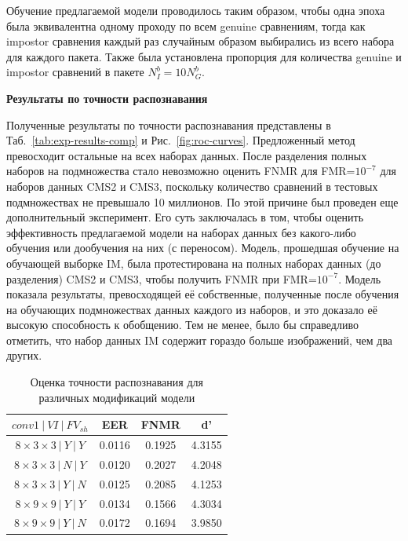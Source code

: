 Обучение предлагаемой модели проводилось таким образом, чтобы одна эпоха была эквивалентна одному проходу по всем genuine сравнениям, тогда как impostor сравнения каждый раз случайным образом выбирались из всего набора для каждого пакета. Также была установлена пропорция для количества genuine и impostor сравнений в пакете $N^b_I=10N^b_G$.

{\bf Результаты по точности распознавания}
\label{sec:fem-nn-exp-results-acc}

Полученные результаты по точности распознавания представлены в Таб.~\ref{tab:exp-results-comp} и Рис.~\ref{fig:roc-curves}. Предложенный метод превосходит остальные на всех наборах данных. После разделения полных наборов на подмножества стало невозможно оценить FNMR для FMR=$10^{-7}$ для наборов данных CMS2 и CMS3, поскольку количество сравнений в тестовых подмножествах не превышало 10 миллионов. По этой причине был проведен еще дополнительный эксперимент. Его суть заключалась в том, чтобы оценить эффективность предлагаемой модели на наборах данных без какого-либо обучения или дообучения на них (с переносом). Модель, прошедшая обучение на обучающей выборке IM, была протестирована на полных наборах данных (до разделения) CMS2 и CMS3, чтобы получить FNMR при FMR=$10^{-7}$. Модель показала результаты, превосходящей её собственные, полученные после обучения на обучающих подмножествах данных каждого из наборов, и это доказало её высокую способность к обобщению. Тем не менее, было бы справедливо отметить, что набор данных IM содержит гораздо больше изображений, чем два других.

\begin{table}
	\begin{center}
		\begin{tabular}{|c|c|c|c|}
			\hline
			\textbf{$conv1~|~VI~|~FV_{sh}$}			& \textbf{EER} 		& \textbf{FNMR}		& \textbf{d'} \\
			\hline
			$8\times3\times3~|~Y~|~Y$				& 0.0116	& 0.1925	& 4.3155\\
			$8\times3\times3~|~N~|~Y$				& 0.0120	& 0.2027	& 4.2048\\
			$8\times3\times3~|~Y~|~N$				& 0.0125	& 0.2085	& 4.1253\\
			$8\times9\times9~|~Y~|~Y$				& 0.0134	& 0.1566	& 4.3034\\
			$8\times9\times9~|~Y~|~N$				& 0.0172	& 0.1694	& 3.9850\\
			\hline
		\end{tabular}
		\caption{Оценка точности распознавания для различных модификаций модели}
		\label{tab:exp-results-extreme}
	\end{center}
\end{table}

